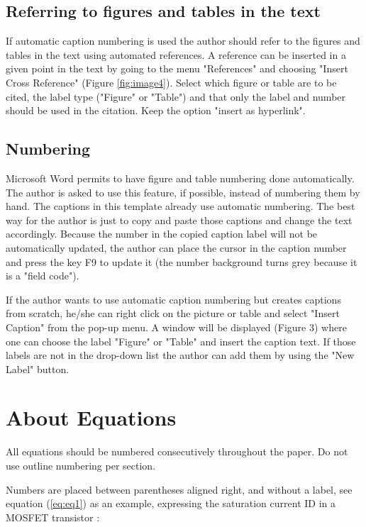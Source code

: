 \documentclass[final]{imeko_acta}
\begin{document}
\subsection{Referring to figures and tables in the text}\label{sec:reffig}

If automatic caption numbering is used the author should refer to the figures and tables in the text using automated references. A reference can be inserted in a given point in the text by going to the menu "References" and choosing "Insert Cross Reference" (Figure \ref{fig:image4}). Select which figure or table are to be cited, the label type ("Figure" or "Table") and that only the label and number should be used in the citation. Keep the option "insert as hyperlink". 

\subsection{Numbering}

Microsoft Word permits to have figure and table numbering done automatically. The author is asked to use this feature, if possible, instead of numbering them by hand. The captions in this template already use automatic numbering. The best way for the author is just to copy and paste those captions and change the text accordingly. Because the number in the copied caption label will not be automatically updated, the author can place the cursor in the caption number and press the key F9 to update it (the number background turns grey because it is a "field code").

If the author wants to use automatic caption numbering but creates captions from scratch, he/she can right click on the picture or table and select "Insert Caption" from the pop-up menu. A window will be displayed (Figure 3) where one can choose the label "Figure" or "Table" and insert the caption text. If those labels are not in the drop-down list the author can add them by using the "New Label" button.

\section{About Equations}

All equations should be numbered consecutively throughout the paper. Do not use outline numbering per section. 

Numbers are placed between parentheses aligned right, and without a label, see equation (\ref{eq:eq1}) as an example, expressing the saturation current ID in a MOSFET transistor \cite{Middelhoek1989}:
\end{document}
